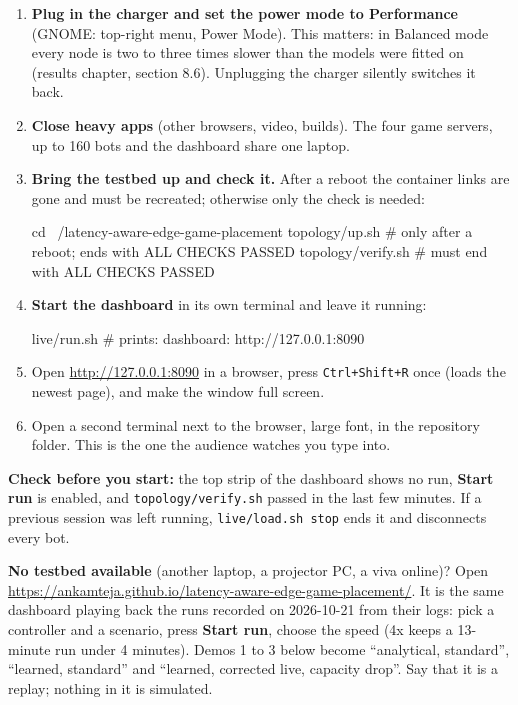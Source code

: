 \documentclass[11pt,a4paper]{article}
\newcommand{\ui}[1]{\textbf{#1}}
\newcommand{\cmd}[1]{\texttt{#1}}
\begin{document}
\begin{enumerate}[leftmargin=*]
\item \textbf{Plug in the charger and set the power mode to Performance}
  (GNOME: top-right menu, Power Mode). This matters: in Balanced mode every
  node is two to three times slower than the models were fitted on (results
  chapter, section 8.6). Unplugging the charger silently switches it back.
\item \textbf{Close heavy apps} (other browsers, video, builds). The four game
  servers, up to 160 bots and the dashboard share one laptop.
\item \textbf{Bring the testbed up and check it.} After a reboot the container
  links are gone and must be recreated; otherwise only the check is needed:
\begin{term}
cd ~/latency-aware-edge-game-placement
topology/up.sh            # only after a reboot; ends with ALL CHECKS PASSED
topology/verify.sh        # must end with ALL CHECKS PASSED
\end{term}
\item \textbf{Start the dashboard} in its own terminal and leave it running:
\begin{term}
live/run.sh               # prints: dashboard: http://127.0.0.1:8090
\end{term}
\item Open \url{http://127.0.0.1:8090} in a browser, press \cmd{Ctrl+Shift+R}
  once (loads the newest page), and make the window full screen.
\item Open a second terminal next to the browser, large font, in the
  repository folder. This is the one the audience watches you type into.
\end{enumerate}

\begin{careful}
\textbf{Check before you start:} the top strip of the dashboard shows no run,
\ui{Start run} is enabled, and \cmd{topology/verify.sh} passed in the last
few minutes. If a previous session was left running, \cmd{live/load.sh stop}
ends it and disconnects every bot.
\end{careful}

\begin{careful}
\textbf{No testbed available} (another laptop, a projector PC, a viva
online)? Open \url{https://ankamteja.github.io/latency-aware-edge-game-placement/}.
It is the same dashboard playing back the runs recorded on 2026-10-21 from
their logs: pick a controller and a scenario, press \ui{Start run}, choose the
speed (4x keeps a 13-minute run under 4 minutes). Demos 1 to 3 below become
``analytical, standard'', ``learned, standard'' and ``learned, corrected live,
capacity drop''. Say that it is a replay; nothing in it is simulated.
\end{careful}
\end{document}
